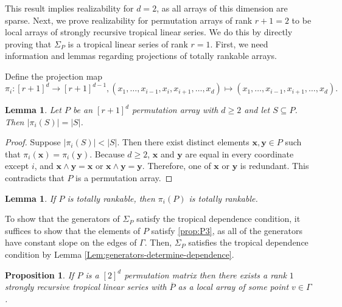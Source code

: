 \documentclass{amsart}
\newtheorem{proposition}[theorem]{Proposition}
\newtheorem{lemma}[theorem]{Lemma}
\begin{document}
	This result implies realizability for $d=2$, as all arrays of this dimension are sparse.	Next, we prove realizability for permutation arrays of rank $r+1=2$ to be local arrays of strongly recursive tropical linear series. We do this by directly proving that $\Sigma_P$ is a tropical linear series of rank $r=1$. First, we need information and lemmas regarding projections of totally rankable arrays.
	
	Define the projection map $$\pi_i:[r+1]^d \to [r+1]^{d-1}, (x_1, \ldots, x_{i-1}, x_i, x_{i+1}, \ldots, x_d) \mapsto (x_1, \ldots, x_{i-1}, x_{i+1}, \ldots, x_d).$$
	
	\begin{lemma}
		\label{Lem:Proj-of-Perm}
		Let $P$ be an $[r+1]^d$ permutation array with $d \geq 2$ and let $S \subseteq P$. Then $|\pi_{i}(S)| = |S|$.
	\end{lemma}
	
	\begin{proof}
		Suppose $|\pi_{i}(S)| < |S|$. Then there exist distinct elements $\mathbf{x}, \mathbf{y} \in P$ such that $\pi_i(\mathbf{x}) = \pi_i(\mathbf{y})$. Because $d \geq 2$, $\mathbf{x}$ and $\mathbf{y}$ are equal in every coordinate except $i$, and $\mathbf{x} \wedge \mathbf{y} = \mathbf{x}$ or $\mathbf{x} \wedge \mathbf{y} = \mathbf{y}$. Therefore, one of $\mathbf{x}$ or $\mathbf{y}$ is redundant. This contradicts that $P$ is a permutation array.
	\end{proof}
	
	\begin{lemma}\cite[Lemma~3.4]{eriksson2000combinatorial}
		\label{Lem:proj-of-totally-rankable}
		If $P$ is totally rankable, then $\pi_i(P)$ is totally rankable.
	\end{lemma}
	
	To show that the generators of $\Sigma_P$ satisfy the tropical dependence condition, it suffices to show that the elements of $P$ satisfy \ref{prop:P3}, as all of the generators have constant slope on the edges of $\Gamma$. Then, $\Sigma_P$ satisfies the tropical dependence condition by Lemma \ref{Lem:generators-determine-dependence}.
	
	\begin{proposition}
		\label{Prop:realization-for-rk1-perm arrays}
		If $P$ is a $[2]^d$ permutation matrix then there exists a rank $1$ strongly recursive tropical linear series with $\overline{P}$ as a local array of some point $v \in \Gamma$.
	\end{proposition}
	
\end{document}
